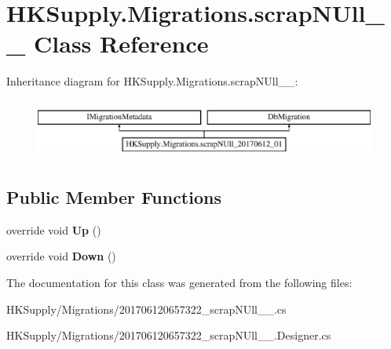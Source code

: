 \hypertarget{class_h_k_supply_1_1_migrations_1_1scrap_n_ull__20170612__01}{}\section{H\+K\+Supply.\+Migrations.\+scrap\+N\+Ull\+\_\+\_ Class Reference}
\label{class_h_k_supply_1_1_migrations_1_1scrap_n_ull__20170612__01}
Inheritance diagram for H\+K\+Supply.\+Migrations.\+scrap\+N\+Ull\+\_\+\_\+:\begin{figure}[H]
\begin{center}
\leavevmode
\includegraphics[height=1.985816cm]{class_h_k_supply_1_1_migrations_1_1scrap_n_ull__20170612__01}
\end{center}
\end{figure}
\subsection*{Public Member Functions}
\begin{DoxyCompactItemize}
\item 
\mbox{\label{class_h_k_supply_1_1_migrations_1_1scrap_n_ull__20170612__01_af7b9aadd4beedcd6cfa697ae0125986c}} 
override void {\bfseries Up} ()
\item 
\mbox{\label{class_h_k_supply_1_1_migrations_1_1scrap_n_ull__20170612__01_abee4b4a872a30dd09ea7a4019acd7393}} 
override void {\bfseries Down} ()
\end{DoxyCompactItemize}


The documentation for this class was generated from the following files\+:\begin{DoxyCompactItemize}
\item 
H\+K\+Supply/\+Migrations/201706120657322\+\_\+scrap\+N\+Ull\+\_\+\_.\+cs\item 
H\+K\+Supply/\+Migrations/201706120657322\+\_\+scrap\+N\+Ull\+\_\+\_.\+Designer.\+cs\end{DoxyCompactItemize}
